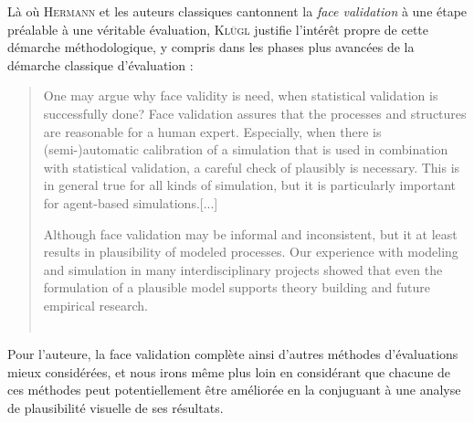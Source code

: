 Là où H\textsc{ermann} et les auteurs classiques cantonnent la \textit{face validation} à une étape préalable à une véritable évaluation, K\textsc{lügl} justifie l'intérêt propre de cette démarche méthodologique, y compris dans les phases plus avancées de la démarche classique d'évaluation :

\begin{quotation}
	\noindent \og One may argue why face validity is need, when statistical validation is successfully done?
	Face validation assures that the processes and structures are reasonable for a human expert.
	Especially, when there is (semi-)automatic calibration of a simulation that is used in combination with statistical validation, a careful check of plausibly is necessary.
	This is in general true for all kinds of simulation, but it is particularly important for agent-based simulations.[...]
	
	\noindent Although face validation may be informal and inconsistent, but it at least results in plausibility of modeled processes.
	Our experience with modeling and simulation in many interdisciplinary projects showed that even the formulation of a plausible model supports theory building and future empirical research.\fg{}\\
	\mbox{}~ \hfill \textcite[40;43]{klugl_validation_2008}
\end{quotation}


Pour l'auteure, la face validation complète ainsi d'autres méthodes d'évaluations mieux considérées, et nous irons même plus loin en considérant que chacune de ces méthodes peut potentiellement être améliorée en la conjuguant à une analyse de plausibilité visuelle de ses résultats.

